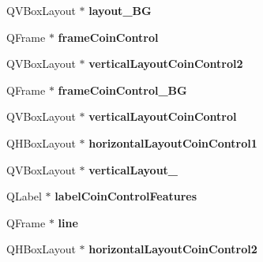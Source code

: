 \begin{DoxyCompactItemize}
\item 
\mbox{\label{class_ui___send_coins_dialog_ad0b30146dfe07a598b0106f5712c4aca}} 
Q\+V\+Box\+Layout $\ast$ {\bfseries layout\+\_\+\+BG}
\item 
\mbox{\label{class_ui___send_coins_dialog_ab10836ce9f6f3c23d579c13437716eca}} 
Q\+Frame $\ast$ {\bfseries frame\+Coin\+Control}
\item 
\mbox{\label{class_ui___send_coins_dialog_ad8cb70f3b7174867e668bcf41cabb932}} 
Q\+V\+Box\+Layout $\ast$ {\bfseries vertical\+Layout\+Coin\+Control2}
\item 
\mbox{\label{class_ui___send_coins_dialog_aef9ea3c1c97b6ce2edfb88d71139a42b}} 
Q\+Frame $\ast$ {\bfseries frame\+Coin\+Control\+\_\+\+BG}
\item 
\mbox{\label{class_ui___send_coins_dialog_a5ae27f9abe442bff3a9eeec89466be43}} 
Q\+V\+Box\+Layout $\ast$ {\bfseries vertical\+Layout\+Coin\+Control}
\item 
\mbox{\label{class_ui___send_coins_dialog_abfd85ca1c65e6dce4bf94e54b26fc931}} 
Q\+H\+Box\+Layout $\ast$ {\bfseries horizontal\+Layout\+Coin\+Control1}
\item 
\mbox{\label{class_ui___send_coins_dialog_a83874e0bd7a5de6eb6d56a54a6674bc3}} 
Q\+V\+Box\+Layout $\ast$ {\bfseries vertical\+Layout\+\_}
\item 
\mbox{\label{class_ui___send_coins_dialog_af457c6a8c10354b0f783a259b6595e8c}} 
Q\+Label $\ast$ {\bfseries label\+Coin\+Control\+Features}
\item 
\mbox{\label{class_ui___send_coins_dialog_a87ee7fca5aa0f3705a1f0e290f3380bf}} 
Q\+Frame $\ast$ {\bfseries line}
\item 
\mbox{\label{class_ui___send_coins_dialog_a895ce9c25aa84fc11b2c73658806c7fb}} 
Q\+H\+Box\+Layout $\ast$ {\bfseries horizontal\+Layout\+Coin\+Control2}

\end{DoxyCompactItemize}
